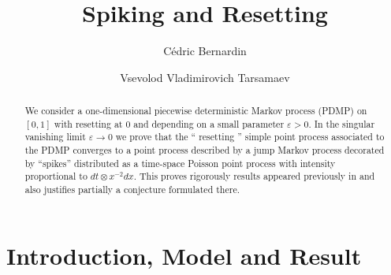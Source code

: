 \documentclass[reqno, 12pt, a4paper]{amsart}
\theoremstyle{plain}
\theoremstyle{definition}
\begin{document}
\title[]{Spiking and Resetting}


\author{C\'edric Bernardin} 
\address{Faculty of Mathematics,National Research University Higher School of Economics, 6 Usacheva, Moscow, 119048, Russia}


\author{Vsevolod Vladimirovich Tarsamaev}
\address{Faculty of Mathematics,National Research University Higher School of Economics, 6 Usacheva, Moscow, 119048, Russia}







\renewcommand{\subjclassname}{%
  \textup{2020} Mathematics Subject Classification}



\maketitle



\begin{abstract}
We consider a one-dimensional piecewise deterministic Markov process (PDMP) on $[0,1]$ with resetting at $0$ and depending on a small parameter $\varepsilon>0$. In the singular vanishing limit $\varepsilon \to 0$ we prove that the `` resetting '' simple point process associated to the PDMP converges to a point process described by a jump Markov process decorated by ``spikes'' distributed as a time-space Poisson point process with intensity proportional to $dt \otimes  x^{-2} dx$. This proves rigorously results appeared previously in \cite{SBDKC25} and also justifies partially a conjecture formulated there. 
\end{abstract}




\section{Introduction, Model and Result}
\label{sec:imr}
\end{document}
